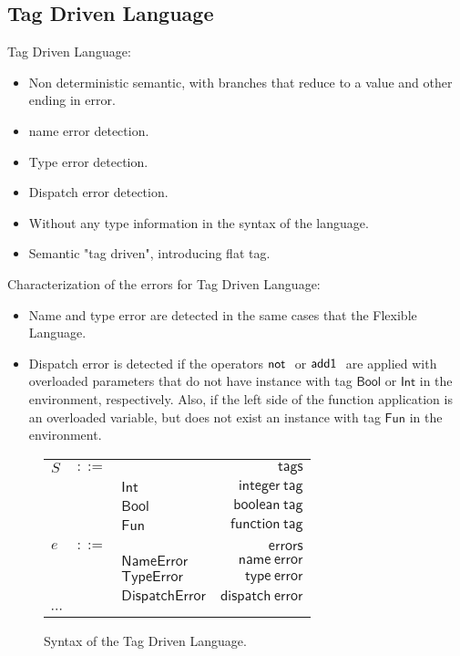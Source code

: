 \documentclass[preprint,authoryear,sort&compress,9pt,nocopyrightspace]{article}
\newcommand{\negacion}[1]{\mathsf{not} \ #1}
\newcommand{\suma}[1]{\mathsf{add1} \ #1}
\newcommand{\boolt}{\mathsf{Bool}}
\newcommand{\intt}{\mathsf{Int}}
\newcommand{\funt}{\mathsf{Fun}}
\newcommand{\nameerror}{\mathsf{NameError}}
\newcommand{\typeerror}{\mathsf{TypeError}}
\newcommand{\dispatcherror}{\mathsf{DispatchError}}
\newcommand{\semanticA}{Flexible Language}
\newcommand{\semanticB}{Tag Driven Language}
\begin{document}
\subsection{\semanticB}
\semanticB:
\begin{itemize}\item Non deterministic semantic, with branches that reduce to a value and other ending in error.
\item name error detection.
\item Type error detection.
\item Dispatch error detection.
\item Without any type information in the syntax of the language.
\item Semantic "tag driven", introducing flat tag.
\end{itemize}
Characterization of the errors for \semanticB:
\begin{itemize}
\item Name and type error are detected in the same cases that the \semanticA.
\item Dispatch error is detected  if the operators $\negacion$ or $\suma$ are applied with overloaded parameters that do not have instance with tag $\boolt$ or $\intt$ in the environment, respectively. Also, if the left side of the function application is an overloaded variable, but does not exist an instance with tag $\funt$ in the environment.
\end{itemize}


\begin{figure}[h]
\begin{small}
\begin{center}
\begin{tabular}{|l c l r|}
\hline
$S$&$::=$&&$\mathsf {tags}$\\
&&$\intt$&$\mathsf {integer \ tag}$\\
&&$\boolt$&$\mathsf {boolean \ tag}$\\
&&$\funt$&$\mathsf {function \ tag}$\\
&&&\\
$e$&$::=$&&$\mathsf {errors}$\\
&&$\nameerror$&$\mathsf {name \ error}$\\
&&$\typeerror$&$\mathsf {type \ error}$\\
&&$\dispatcherror$&$\mathsf {dispatch \ error}$\\
$\cdots$&&&\\
\hline
\end{tabular}
\caption{Syntax of the \semanticB.}
\label{figure:syntax2}
\end{center}
\end{small}
\end{figure}
\end{document}
